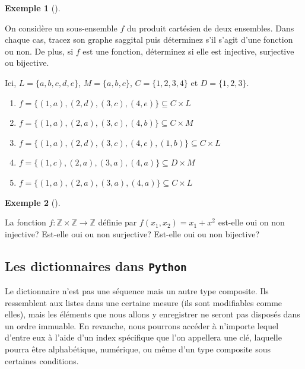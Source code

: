 \documentclass[
  letterpaper,
]{scrbook}
\providecommand{\tightlist}{%
  \setlength{\itemsep}{0pt}\setlength{\parskip}{0pt}}\usepackage{longtable,booktabs,array}
\newcommand{\set}[1]{\{#1\}}
\theoremstyle{plain}
\theoremstyle{definition}
\theoremstyle{definition}
\newtheorem{example}{Exemple}[chapter]
\theoremstyle{remark}
\begin{document}
\begin{example}[]\protect\hypertarget{exm-fonction-injective-surjective-bijective}{}\label{exm-fonction-injective-surjective-bijective}

On considère un sous-ensemble \(f\) du produit cartésien de deux
ensembles. Dans chaque cas, tracez son graphe saggital puis déterminez
s'il s'agit d'une fonction ou non. De plus, si \(f\) est une fonction,
déterminez si elle est injective, surjective ou bijective.

Ici, \(L=\set{a,b,c,d,e}\), \(M=\set{a,b,c}\), \(C=\set{1,2,3,4}\) et
\(D=\set{1,2,3}\).

\begin{enumerate}
\def\labelenumi{\alph{enumi}.}
\tightlist
\item
  \(f=\set{(1,a),(2,d),(3,c),(4,e)}\subseteq C \times L\)
\item
  \(f=\set{(1,a),(2,a),(3,c),(4,b)}\subseteq C \times M\)
\item
  \(f=\set{(1,a),(2,d),(3,c),(4,e),(1,b)}\subseteq C \times L\)
\item
  \(f=\set{(1,c),(2,a),(3,a),(4,a)}\subseteq D \times M\)
\item
  \(f=\set{(1,a),(2,a),(3,a),(4,a)}\subseteq C \times L\)
\end{enumerate}

\end{example}

\begin{example}[]\protect\hypertarget{exm-fonction-dans-Z}{}\label{exm-fonction-dans-Z}

La fonction \(f:\mathbb{Z}\times\mathbb{Z}\rightarrow \mathbb{Z}\)
définie par \(f(x_1,x_2)=x_1+x^2\) est-elle oui on non injective?
Est-elle oui ou non surjective? Est-elle oui ou non bijective?

\end{example}

\hypertarget{les-dictionnaires-dans-python}{%
\subsection{\texorpdfstring{Les dictionnaires dans
\texttt{Python}}{Les dictionnaires dans Python}}\label{les-dictionnaires-dans-python}}

Le dictionnaire n'est pas une séquence mais un autre type composite. Ils
ressemblent aux listes dans une certaine mesure (ils sont modifiables
comme elles), mais les éléments que nous allons y enregistrer ne seront
pas disposés dans un ordre immuable. En revanche, nous pourrons accéder
à n'importe lequel d'entre eux à l'aide d'un index spécifique que l'on
appellera une clé, laquelle pourra être alphabétique, numérique, ou même
d'un type composite sous certaines conditions.
\end{document}
